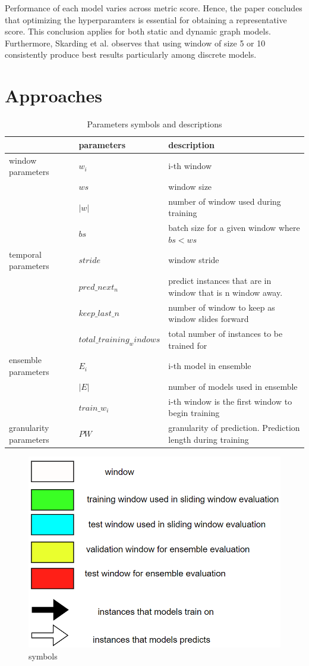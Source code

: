 \documentclass{IEEEtran}
\begin{document}
Performance of each model varies across metric score. Hence, the paper concludes that optimizing the hyperparamters is essential for obtaining a representative score. This conclusion applies for both static and dynamic graph models. Furthermore, Skarding et al. observes that using window of size 5 or 10 consistently produce best results particularly among discrete models.
\section{Approaches}
\label{sec:org12a6b2f}
\begin{table}[htbp]
\caption{\label{parameters}Parameters symbols and descriptions}
\centering
\begin{tabular}{lll}
\hline
\hline
 & parameters & description\\
\hline
window parameters & \(w_i\) & i-th window\\
 & \(ws\) & window size\\
 & \(\vert w \vert\) & number of window used during training\\
 & \(bs\) & batch size for a given window where \(bs < ws\)\\
temporal parameters & \(stride\) & window stride\\
 & \(pred\_next_{n}\) & predict instances that are in window that is n window away.\\
 & \(keep\_last\_n\) & number of window to keep as window slides forward\\
 & \(total\_training_windows\) & total number of instances to be trained for\\
ensemble parameters & \(E_i\) & i-th model in ensemble\\
 & \(\vert E \vert\) & number of models used in ensemble\\
 & \(train\_w_{i}\) & i-th window is the first window to begin training\\
granularity parameters & \(PW\) & granularity of prediction. Prediction length during training\\
\end{tabular}
\end{table}

\begin{figure}[htbp]
\centering
\includegraphics[width=.9\linewidth]{./images/screenshot_20220321_130824.png}
\caption{\label{symbols}symbols}
\end{figure}
\end{document}
